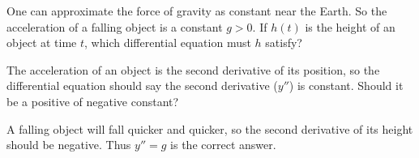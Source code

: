 \documentclass{ximera}
\begin{document}
\begin{question}
	One can approximate the force of gravity as constant near the Earth.  So the acceleration of a falling object is a constant $g>0$.  If $h(t)$ is the height of an object at time $t$, which differential equation must $h$ satisfy?
	
	\begin{multipleChoice}
	\end{multipleChoice}
	
	\begin{hint}
		The acceleration of an object is the second derivative of its position, so the differential equation should say the second derivative ($y''$) is constant.  Should it be a positive of negative constant?
	\end{hint}
	\begin{hint}
		A falling object will fall quicker and quicker, so the second derivative of its height should be negative.  Thus $y''=g$ is the correct answer.
	\end{hint}	
\end{question}
\end{document}
